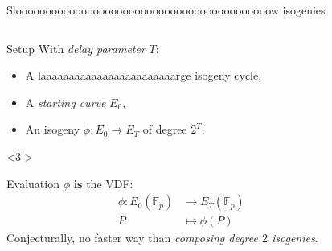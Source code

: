\documentclass[aspectratio=169]{beamer}
\newcommand{\F}{\mathbb{F}}
\begin{document}

\begin{frame}{Slooooooooooooooooooooooooooooooooooooooooooow isogenies}
  \begin{columns}
    \begin{column}{0.6\textwidth}
      \begin{block}{Setup}
        With \emph{delay parameter} $T$:
        \begin{itemize}
        \item A laaaaaaaaaaaaaaaaaaaaaaaarge isogeny cycle,
        \item<2-> A \emph{starting curve} $E_0$,
        \item<2-> An isogeny \emph{$\phi:E_0\to E_T$} of degree \emph{$2^T$}.
        \end{itemize}
      \end{block}

      \begin{uncoverenv}<3->
        \begin{block}{Evaluation}
          $\phi$ \textbf{is} the VDF:
          \begin{align*}
            \phi:E_0(\F_p) &\longrightarrow E_T(\F_p)\\
            P &\longmapsto \phi(P)
          \end{align*}
          Conjecturally, no faster way than \emph{composing degree $2$
            isogenies}.
        \end{block}
      \end{uncoverenv}
    \end{column}
    \begin{column}{0.37\textwidth}
      \centering
    \end{column}
  \end{columns}  
\end{frame}
\end{document}
